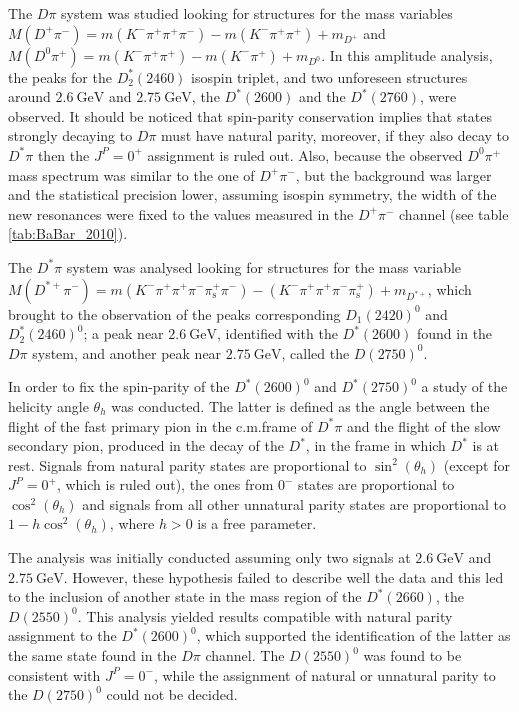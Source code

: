 The $D \pi$ system was studied looking for structures for the mass variables $M \left( D^+ \pi^- \right) = m \left( K^- \pi^+ \pi^+ \pi^- \right) - m \left( K^- \pi^+ \pi^+ \right) + m_{D^+}$ and $M \left( D^0 \pi^+ \right) = m \left( K^- \pi^+ \pi^+ \right) - m \left( K^- \pi^+ \right) + m_{D^0}$. In this amplitude analysis, the peaks for the $D^*_2(2460)$ isospin triplet, and two unforeseen structures around $2.6 \ \text{GeV}$ and $2.75 \ \text{GeV}$, the $D^*(2600)$ and the $D^*(2760)$, were observed. It should be noticed that spin-parity conservation implies that states strongly decaying to $D \pi$ must have natural parity, moreover, if they also decay to $D^* \pi$ then the $J^P = 0^+$ assignment is ruled out. Also, because the observed $D^0 \pi^+$ mass spectrum was similar to the one of $D^+ \pi^-$, but the background was larger and the statistical precision lower, assuming isospin symmetry, the width of the new resonances were fixed to the values measured in the $D^+ \pi^-$ channel (see table \ref{tab:BaBar_2010}).

The $D^* \pi$ system was analysed looking for structures for the mass variable $M \left( D^{*+} \pi^- \right) = m \left( K^- \pi^+ \pi^+ \pi^- \pi^+_\text{s} \pi^- \right) - \left( K^- \pi^+ \pi^+ \pi^- \pi^+_\text{s} \right) + m_{D^{* +}}$, which brought to the observation of the peaks corresponding $D_1(2420)^0$ and $D^*_2(2460)^0$; a peak near $2.6 \ \text{GeV}$, identified with the $D^*(2600)$ found in the $D \pi$ system, and another peak near $2.75 \ \text{GeV}$, called the $D(2750)^0$.

In order to fix the spin-parity of the $D^*(2600)^0$ and $D^*(2750)^0$ a study of the helicity angle $\theta_h$ was conducted. The latter is defined as the angle between the flight of the fast primary pion in the c.m.\@ frame of $D^* \pi$ and the flight of the slow secondary pion, produced in the decay of the $D^*$, in the frame in which $D^*$ is at rest. Signals from natural parity states are proportional to $\sin^2(\theta_h)$ (except for $J^P = 0^+$, which is ruled out), the ones from $0^-$ states are proportional to $\cos^2(\theta_h)$ and signals from all other unnatural parity states are proportional to $1 - h \cos^2(\theta_h)$, where $h > 0$ is a free parameter.

The analysis was initially conducted assuming only two signals at $2.6 \ \text{GeV}$ and $2.75 \ \text{GeV}$. However, these hypothesis failed to describe well the data and this led to the inclusion of another state in the mass region of the $D^*(2660)$, the $D(2550)^0$. This analysis yielded results compatible with natural parity assignment to the $D^*(2600)^0$, which supported the identification of the latter as the same state found in the $D \pi$ channel. The $D(2550)^0$ was found to be consistent with $J^P = 0^-$, while the assignment of natural or unnatural parity to the $D(2750)^0$ could not be decided.

